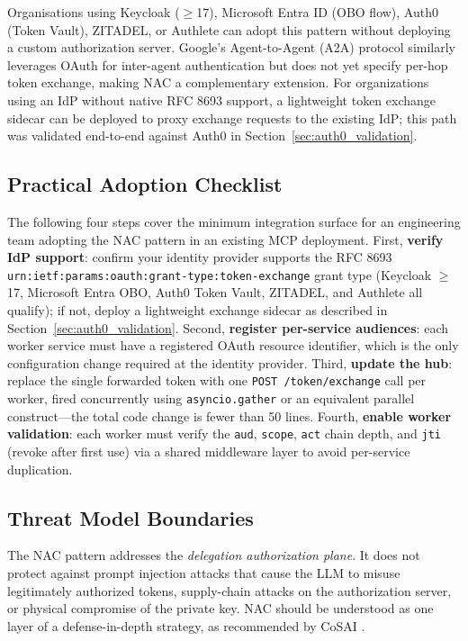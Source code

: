\documentclass[journal]{IEEEtran}
\begin{document}
Organisations using Keycloak ($\geq$17), Microsoft Entra ID (OBO flow), Auth0
(Token Vault), ZITADEL, or Authlete can adopt this pattern without deploying a
custom authorization server. Google's Agent-to-Agent (A2A) protocol
\cite{google_a2a} similarly leverages OAuth for inter-agent authentication but
does not yet specify per-hop token exchange, making NAC a complementary
extension. For organizations using an IdP without native RFC 8693 support, a
lightweight token exchange sidecar can be deployed to proxy exchange requests
to the existing IdP; this path was validated end-to-end against Auth0 in
Section~\ref{sec:auth0_validation}.

\subsection{Practical Adoption Checklist}

The following four steps cover the minimum integration surface for an engineering
team adopting the NAC pattern in an existing MCP deployment. First,
\textbf{verify IdP support}: confirm your identity provider supports the RFC 8693
\texttt{urn:ietf:params:oauth:grant-type:token-exchange} grant type (Keycloak
$\geq$17, Microsoft Entra OBO, Auth0 Token Vault, ZITADEL, and Authlete all
qualify); if not, deploy a lightweight exchange sidecar as described in
Section~\ref{sec:auth0_validation}. Second, \textbf{register per-service
audiences}: each worker service must have a registered OAuth resource identifier,
which is the only configuration change required at the identity provider. Third,
\textbf{update the hub}: replace the single forwarded token with one
\texttt{POST /token/exchange} call per worker, fired concurrently using
\texttt{asyncio.gather} or an equivalent parallel construct---the total code
change is fewer than 50 lines. Fourth, \textbf{enable worker validation}: each
worker must verify the \texttt{aud}, \texttt{scope}, \texttt{act} chain depth,
and \texttt{jti} (revoke after first use) via a shared middleware layer to
avoid per-service duplication.

\subsection{Threat Model Boundaries}

The NAC pattern addresses the \textit{delegation authorization plane}. It does
not protect against prompt injection attacks that cause the LLM to misuse
legitimately authorized tokens, supply-chain attacks on the authorization server,
or physical compromise of the private key. NAC should be understood as one layer
of a defense-in-depth strategy, as recommended by CoSAI \cite{cosai_mcp}.
\end{document}
